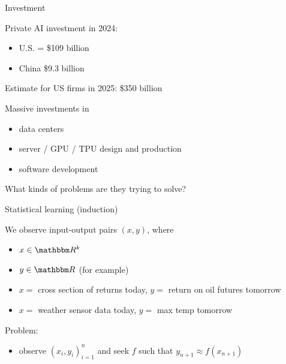 \begin{frame}{Investment}

    Private AI investment in 2024:

    \begin{itemize}
        \item U.S. = \$109 billion 
        \vspace{0.5em}
        \item China \$9.3 billion 
    \end{itemize}

        \vspace{0.5em}
    Estimate for US firms in 2025: \$350 billion

        \vspace{0.5em}
    Massive investments in 

    \begin{itemize}
        \item data centers
        \vspace{0.5em}
        \item server / GPU / TPU design and production
        \vspace{0.5em}
        \item software development
    \end{itemize}

\end{frame}


\begin{frame}
    
    What kinds of problems are they trying to solve?

\end{frame}




\begin{frame}{Statistical learning (induction)}
    
    We observe input-output pairs $(x, y)$, where
    \begin{itemize}
        \item $x \in \RR^k$
        \item $y \in \RR$  (for example)
    \end{itemize}

    \Egs
    \begin{itemize}
        \item $x = $ cross section of returns today, $y = $ return on oil futures tomorrow
        \vspace{0.5em}
        \item $x = $ weather sensor data today, $y = $ max temp tomorrow
    \end{itemize}
        \vspace{0.5em}
        \vspace{0.5em}

    Problem:

    \begin{itemize}
        \item observe $(x_i, y_i)_{i=1}^n$ and seek $f$ such that $y_{n+1}
            \approx f(x_{n+1})$
    \end{itemize}

\end{frame}


